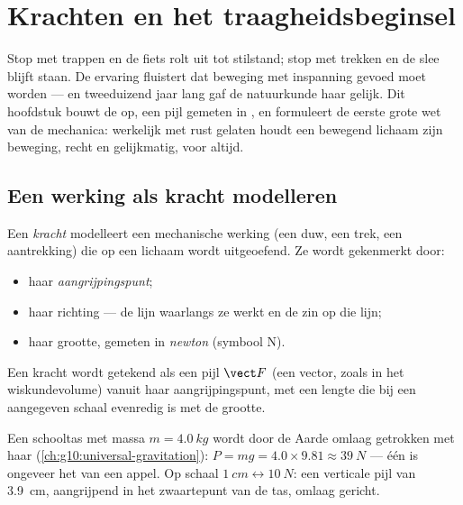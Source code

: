 \chapter{Krachten en het traagheidsbeginsel}\label{ch:g10:inertia}

Stop met trappen en de fiets rolt uit tot stilstand; stop met trekken en
de slee blijft staan. De ervaring fluistert dat beweging met inspanning
gevoed moet worden --- en tweeduizend jaar lang gaf de natuurkunde haar
gelijk. Dit hoofdstuk bouwt de  op, een pijl gemeten in , en
formuleert de eerste grote wet van de mechanica: werkelijk met rust
gelaten houdt een bewegend lichaam zijn beweging, recht en gelijkmatig,
voor altijd.

\section{Een werking als kracht modelleren}

\begin{definition}[Kracht]\label{def:g10:inertia:force}
Een \emph{kracht} modelleert een mechanische werking (een
duw, een trek, een aantrekking) die op een lichaam wordt uitgeoefend. Ze
wordt gekenmerkt door:
\begin{itemize}
  \item haar \emph{aangrijpingspunt};
  \item haar richting --- de lijn waarlangs ze werkt en de zin op die
        lijn;
  \item haar grootte, gemeten in \emph{newton} (symbool
        \unit{N}).
\end{itemize}
Een kracht wordt getekend als een pijl $\vect F$ (een vector, zoals in
het wiskundevolume) vanuit haar aangrijpingspunt, met een lengte die bij
een aangegeven schaal evenredig is met de grootte.
\end{definition}

\begin{example}\label{ex:g10:inertia:schoolbag}
Een schooltas met massa $m = \qty{4.0}{kg}$ wordt door de Aarde omlaag
getrokken met haar  (\cref{ch:g10:universal-gravitation}):
$P = mg = 4.0 \times 9.81 \approx \qty{39}{N}$ --- één  is
ongeveer het  van een appel. Op schaal
$\qty{1}{cm} \leftrightarrow \qty{10}{N}$: een verticale pijl van
\qty{3.9}{cm}, aangrijpend in het zwaartepunt van de tas, omlaag
gericht.
\end{example}

